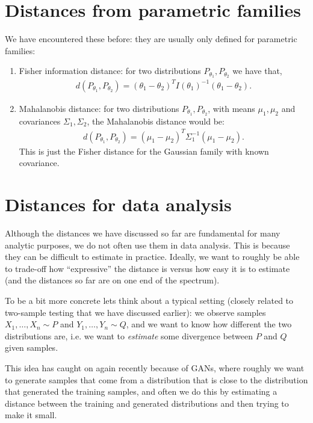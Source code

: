 \documentclass[twoside,12pt]{article}
\begin{document}
\section{Distances from parametric families}
We have encountered these before: they are usually only defined for parametric families:
\begin{enumerate}
\item Fisher information distance: for two distributions $P_{\theta_1}, P_{\theta_2}$ we have that,
\begin{align*}
d(P_{\theta_1},P_{\theta_2}) = (\theta_1 - \theta_2)^T I(\theta_1)^{-1} (\theta_1 - \theta_2).
\end{align*}
\item Mahalanobis distance: for two distributions $P_{\theta_1}, P_{\theta_2}$, with means $\mu_1, \mu_2$ and covariances $\Sigma_1, \Sigma_2$, the Mahalanobis distance would be:
\begin{align*}
d(P_{\theta_1},P_{\theta_2}) = (\mu_1 - \mu_2)^T \Sigma_1^{-1} (\mu_1 - \mu_2).
\end{align*}
This is just the Fisher distance for the Gaussian family with known covariance.
\end{enumerate}

\section{Distances for data analysis}
Although the distances we have discussed so far are fundamental for many analytic purposes, we do not often use them in data analysis. This is because they can be difficult to estimate in practice.  Ideally, we want to roughly be able to trade-off how ``expressive'' the distance is versus how easy it is to estimate (and the distances so far are on one end of the spectrum).

To be a bit more concrete lets think about a typical setting (closely related to two-sample testing that we have discussed earlier): we observe samples $X_1,\ldots,X_n \sim P$ and $Y_1,\ldots,Y_n \sim Q$, and we want to know how different the two distributions are, i.e. we want to \emph{estimate} some divergence between $P$ and $Q$ given samples.

This idea has caught on again recently because of GANs, where roughly we want to generate samples that come from a distribution that is close to the distribution that generated the training samples, and often we do this by estimating a distance between the training and generated distributions and then trying to make it small.
\end{document}

